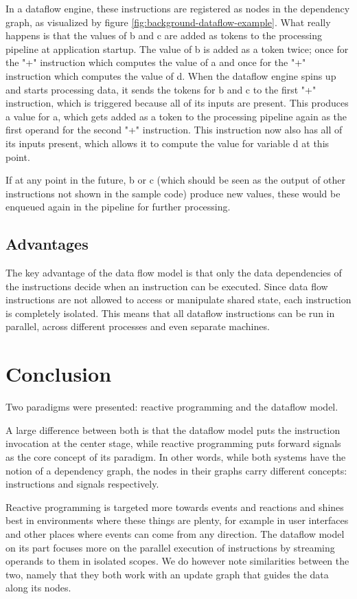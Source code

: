 In a dataflow engine, these instructions are registered as nodes in the dependency graph, as visualized by figure \ref{fig:background-dataflow-example}. What really happens is that the values of b and c are added as tokens to the processing pipeline at application startup. The value of b is added as a token twice; once for the "+" instruction which computes the value of a and once for the "+" instruction which computes the value of d. When the dataflow engine spins up and starts processing data, it sends the tokens for b and c to the first "+" instruction, which is triggered because all of its inputs are present. This produces a value for a, which gets added as a token to the processing pipeline again as the first operand for the second "+" instruction. This instruction now also has all of its inputs present, which allows it to compute the value for variable d at this point.

If at any point in the future, b or c (which should be seen as the output of other instructions not shown in the sample code) produce new values, these would be enqueued again in the pipeline for further processing.

\subsection{Advantages}

The key advantage of the data flow model is that only the data dependencies of the instructions decide when an instruction can be executed. Since data flow instructions are not allowed to access or manipulate shared state, each instruction is completely isolated. This means that all dataflow instructions can be run in parallel, across different processes and even separate machines.

\section{Conclusion}

Two paradigms were presented: reactive programming and the dataflow model. 

A large difference between both is that the dataflow model puts the instruction invocation at the center stage, while reactive programming puts forward signals as the core concept of its paradigm. In other words, while both systems have the notion of a dependency graph, the nodes in their graphs carry different concepts: instructions and signals respectively.

Reactive programming is targeted more towards events and reactions and shines best in environments where these things are plenty, for example in user interfaces and other places where events can come from any direction. The dataflow model on its part focuses more on the parallel execution of instructions by streaming operands to them in isolated scopes. We do however note similarities between the two, namely that they both work with an update graph that guides the data along its nodes. 



